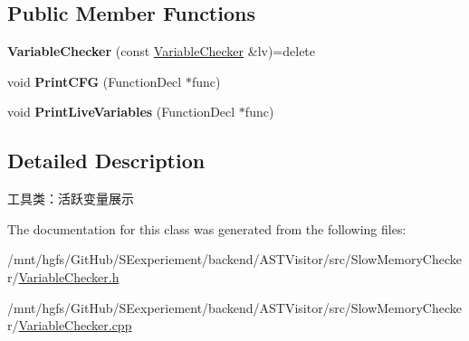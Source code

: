 \subsection*{Public Member Functions}
\begin{DoxyCompactItemize}
\item 
\mbox{\label{classVariableChecker_aae94b88c0d8cd1ed982c1104ff8a5620}} 
{\bfseries Variable\+Checker} (const \hyperlink{classVariableChecker}{Variable\+Checker} \&lv)=delete
\item 
\mbox{\label{classVariableChecker_a176b4f4fadabfe1a2243433fd904d815}} 
void {\bfseries Print\+C\+FG} (Function\+Decl $\ast$func)
\item 
\mbox{\label{classVariableChecker_a9196341d6d8a0d80c045fc0d03d6f348}} 
void {\bfseries Print\+Live\+Variables} (Function\+Decl $\ast$func)
\end{DoxyCompactItemize}


\subsection{Detailed Description}
工具类：活跃变量展示 

The documentation for this class was generated from the following files\+:\begin{DoxyCompactItemize}
\item 
/mnt/hgfs/\+Git\+Hub/\+S\+Eexperiement/backend/\+A\+S\+T\+Visitor/src/\+Slow\+Memory\+Checker/\hyperlink{VariableChecker_8h}{Variable\+Checker.\+h}\item 
/mnt/hgfs/\+Git\+Hub/\+S\+Eexperiement/backend/\+A\+S\+T\+Visitor/src/\+Slow\+Memory\+Checker/\hyperlink{VariableChecker_8cpp}{Variable\+Checker.\+cpp}\end{DoxyCompactItemize}
